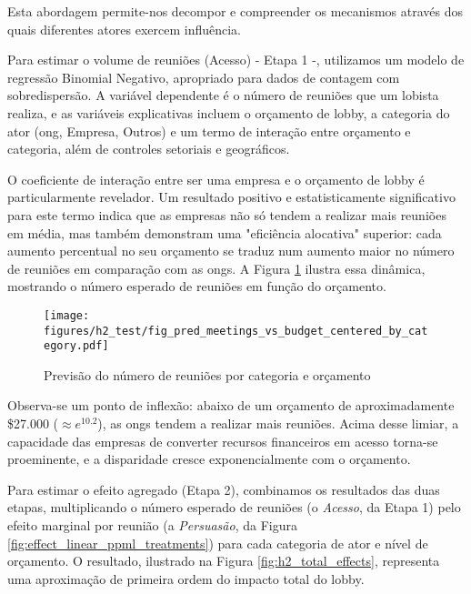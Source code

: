 Esta abordagem permite-nos decompor e compreender os mecanismos através dos quais diferentes atores exercem influência.

Para estimar o volume de reuniões (Acesso) - Etapa 1 -, utilizamos um modelo de regressão Binomial Negativo, apropriado para dados de contagem com sobredispersão. A variável dependente é o número de reuniões que um lobista realiza, e as variáveis explicativas incluem o orçamento de lobby, a categoria do ator (\acrshort{ong}, Empresa, Outros) e um termo de interação entre orçamento e categoria, além de controles setoriais e geográficos.

O coeficiente de interação entre ser uma empresa e o orçamento de lobby é particularmente revelador. Um resultado positivo e estatisticamente significativo para este termo indica que as empresas não só tendem a realizar mais reuniões em média, mas também demonstram uma "eficiência alocativa" superior: cada aumento percentual no seu orçamento se traduz num aumento maior no número de reuniões em comparação com as \acrshort{ong}s. A Figura \ref{fig:h2_pred_meetings} ilustra essa dinâmica, mostrando o número esperado de reuniões em função do orçamento.

\begin{figure}[htbp]
    \centering
    \texttt{[image: figures/h2\_test/fig\_pred\_meetings\_vs\_budget\_centered\_by\_category.pdf]}
    \caption{Previsão do número de reuniões por categoria e orçamento}
    \label{fig:h2_pred_meetings}
\end{figure}

Observa-se um ponto de inflexão: abaixo de um orçamento de aproximadamente \$27.000 ($\approx e^{10.2}$), as \acrshort{ong}s tendem a realizar mais reuniões. Acima desse limiar, a capacidade das empresas de converter recursos financeiros em acesso torna-se proeminente, e a disparidade cresce exponencialmente com o orçamento.

Para estimar o efeito agregado (Etapa 2), combinamos os resultados das duas etapas, multiplicando o número esperado de reuniões (o \textit{Acesso}, da Etapa 1) pelo efeito marginal por reunião (a \textit{Persuasão}, da Figura \ref{fig:effect_linear_ppml_treatments}) para cada categoria de ator e nível de orçamento. O resultado, ilustrado na Figura \ref{fig:h2_total_effects}, representa uma aproximação de primeira ordem do impacto total do lobby.

